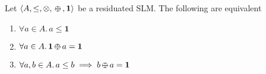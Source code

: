 \documentclass{llncs}
\def\1{{\mathbf 1}}
\newcommand{\shortNoProof}[1]{ }
\def\monid{{\mathbf 0}}
\def\1{{\mathbf 1}}
\def\monop{\otimes}
\def\odiv{\, {\ominus\hspace{-7.7pt} \div} \,}
\def\monid{\mathbf{1}}
\begin{document}
\begin{proposition}\label{reabs}
	Let $\langle A, \leq, \monop, \odiv, \monid \rangle$ be a residuated SLM. The following are equivalent
	\begin{enumerate}
		\item $\forall a \in A.\, a \leq \1$
		\item $\forall a \in A.\, \1 \odiv a = \1$		
		\item $\forall a, b \in A.\, a \leq b \implies b \odiv a = \1$
	\end{enumerate}	
\end{proposition}

\shortNoProof
{
\begin{proof}
Note that $1$ immediately implies both $2$ and $3$, since by definition $a \leq b$ implies $\1 \leq b \odiv a$
and $\1$ is the top of the partial order.

For the second step, first note that both properties implies that $\1 \odiv a \leq \1$ for all $a \in A$. This is immediate
for $2$. As for $3$, %
consider $b = \bigvee \{\1, a \}$. By Lemma~\ref{distodiv} we have that
$\bigvee \{\1 \odiv a, a \odiv a\} \leq \bigvee \{\1, a \} \odiv a$. 
Hence, $\1 \odiv a \leq \1$ for all $a \in A$, and the result follows.

Finally, note that $\1 \odiv a \leq \1$ for all $a \in A$ implies that $\1 \odiv (\1 \odiv c) \leq \1$ for all $c \in A$, 
and since it always holds
that $c \leq \1 \odiv (\1 \odiv c)$, then $3$ implies $1$.
\qed
\end{proof}
}

\end{document}
